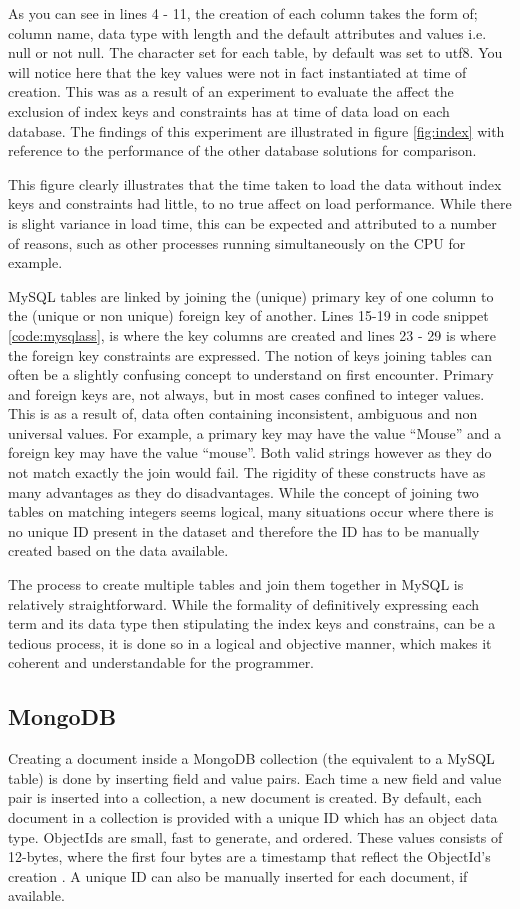 As you can see in lines 4 - 11, the creation of each column takes the form of; column name, data type with length and the default attributes and values i.e. null or not null. The character set for each table, by default was set to utf8. You will notice here that the key values were not in fact instantiated at time of creation. This was as a result of an experiment to evaluate the affect the exclusion of index keys and constraints has at time of data load on each database. The findings of this experiment are illustrated in figure \ref{fig:index} with reference to the performance of the other database solutions for comparison.

This figure clearly illustrates that the time taken to load the data without index keys and constraints had little, to no true affect on load performance. While there is slight variance in load time, this can be expected and attributed to a number of reasons, such as other processes running simultaneously on the CPU for example.

MySQL tables are linked by joining the (unique) primary key of one column to the (unique or non unique) foreign key of another. Lines 15-19 in code snippet \ref{code:mysqlass}, is where the key columns are created and lines 23 - 29 is where the foreign key constraints are expressed. The notion of keys joining tables can often be a slightly confusing concept to understand on first encounter. Primary and foreign keys are, not always, but in most cases confined to integer values. This is as a result of, data often containing inconsistent, ambiguous and non universal values. For example, a primary key may have the value ``Mouse'' and a foreign key may have the value ``mouse''. Both valid strings however as they do not match exactly the join would fail. The rigidity of these constructs have as many advantages as they do disadvantages. While the concept of joining two tables on matching integers seems logical, many situations occur where there is no unique ID present in the dataset and therefore the ID has to be manually created based on the data available.

The process to create multiple tables and join them together in MySQL is relatively straightforward. While the formality of definitively expressing each term and its data type then stipulating the index keys and constrains, can be a tedious process, it is done so in a logical and objective manner, which makes it coherent and understandable for the programmer.

\subsection*{MongoDB}
Creating a document inside a MongoDB collection (the equivalent to a MySQL table) is done by inserting field and value pairs. Each time a new field and value pair is inserted into a collection, a new document is created. By default, each document in a collection is provided with a unique ID which has an object data type. ObjectIds are small, fast to generate, and ordered. These values consists of 12-bytes, where the first four bytes are a timestamp that reflect the ObjectId’s creation \cite{mongo}. A unique ID can also be manually inserted for each document, if available.

